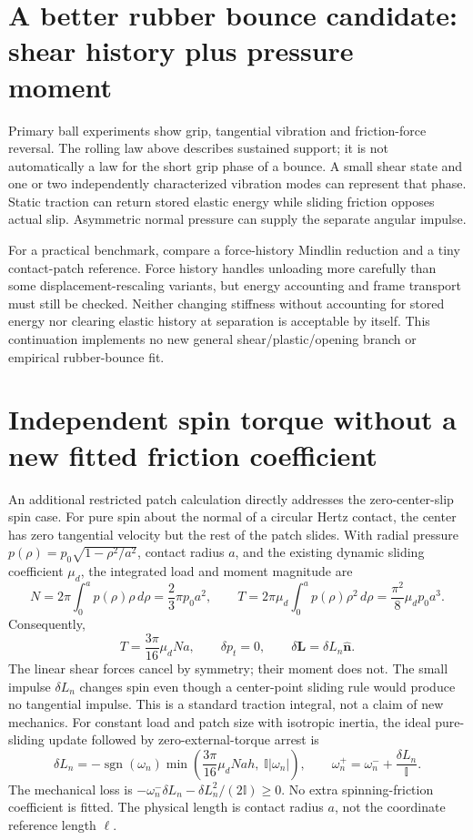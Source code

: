 \documentclass[10pt,a4paper]{article}
\begin{document}
\section*{A better rubber bounce candidate: shear history plus pressure moment}
Primary ball experiments show grip, tangential vibration and friction-force reversal.
The rolling law above describes sustained support; it is not automatically a law
for the short grip phase of a bounce. A small shear state and one or two independently
characterized vibration modes can represent that phase. Static traction can return
stored elastic energy while sliding friction opposes actual slip. Asymmetric
normal pressure can supply the separate angular impulse.

For a practical benchmark, compare a force-history Mindlin reduction and a tiny
contact-patch reference. Force history handles unloading more carefully than some
displacement-rescaling variants, but energy accounting and frame transport must
still be checked. Neither changing stiffness without accounting for stored energy
nor clearing elastic history at separation is acceptable by itself. This continuation
implements no new general shear/plastic/opening branch or empirical rubber-bounce fit.

\newpage
\section*{Independent spin torque without a new fitted friction coefficient}
An additional restricted patch calculation directly addresses the zero-center-slip
spin case. For pure spin about the normal of a circular Hertz contact, the center
has zero tangential velocity but the rest of the patch slides. With radial pressure
$p(\rho)=p_0\sqrt{1-\rho^2/a^2}$, contact radius $a$, and the existing dynamic
sliding coefficient $\mu_d$, the integrated load and moment magnitude are
\[
 N=2\pi\int_0^a p(\rho)\rho\,d\rho=\frac23\pi p_0a^2,
 \qquad
 T=2\pi\mu_d\int_0^a p(\rho)\rho^2\,d\rho
   =\frac{\pi^2}{8}\mu_dp_0a^3.
\]
Consequently,
\[
 T=\frac{3\pi}{16}\mu_dNa,\qquad
 \delta p_t=0,\qquad
 \delta\mathbf L=\delta L_n\hat{\mathbf n}.
\]
The linear shear forces cancel by symmetry; their moment does not. The small
impulse $\delta L_n$ changes spin even though a center-point sliding rule would
produce no tangential impulse. This is a standard traction integral, not a claim
of new mechanics. For constant load and patch size with isotropic inertia, the
ideal pure-sliding update followed by zero-external-torque arrest is
\[
 \delta L_n=-\operatorname{sgn}(\omega_n)
 \min\!\left(\frac{3\pi}{16}\mu_dNah,\;\mathbb I|\omega_n|\right),
 \qquad \omega_n^+=\omega_n^-+\frac{\delta L_n}{\mathbb I}.
\]
The mechanical loss is
$-\omega_n^-\delta L_n-\delta L_n^2/(2\mathbb I)\ge0$.
No extra spinning-friction coefficient is fitted. The physical length is contact
radius $a$, not the coordinate reference length $\ell$.
\end{document}
